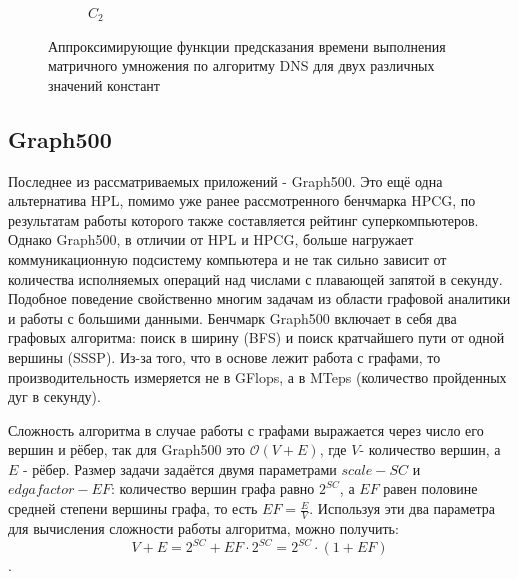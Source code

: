 \begin{figure}
\begin{subfigure}{.5\textwidth}
				\caption{\(C_2\)}
				\label{graph_C_2_DNS}
			\end{subfigure}
			\caption{Аппроксимирующие функции предсказания времени выполнения матричного умножения по алгоритму DNS для двух различных значений констант}
			\label{graph_DNS}
			\end{figure}

	\subsection{Graph500}
		Последнее из рассматриваемых приложений - Graph500. Это ещё одна альтернатива HPL, помимо уже ранее рассмотренного бенчмарка HPCG, по результатам работы которого также составляется рейтинг суперкомпьютеров. Однако Graph500, в отличии от HPL и HPCG, больше нагружает коммуникационную подсистему компьютера и не так сильно зависит от количества исполняемых операций над числами с плавающей запятой в секунду. Подобное поведение свойственно многим задачам из области графовой аналитики и работы с большими данными. Бенчмарк Graph500 включает в себя два графовых алгоритма: поиск в ширину (BFS) и поиск кратчайшего пути от одной вершины (SSSP). Из-за того, что в основе лежит работа с графами, то производительность измеряется не в GFlops, а в MTeps (количество пройденных дуг в секунду).

		Сложность алгоритма в случае работы с графами выражается через число его вершин и рёбер, так для Graph500 это \(\mathcal{O}(V + E)\), где \(V\)- количество вершин, а \(E\) - рёбер. Размер задачи задаётся двумя параметрами \(scale - SC\) и \(edgafactor - EF\): количество вершин графа равно \(2^{SC}\), а \(EF\) равен половине средней степени вершины графа, то есть \(EF = \frac{E}{V}\). Используя эти два параметра для вычисления сложности работы алгоритма, можно получить: \[V + E = 2^{SC} + EF \cdot 2^{SC} = 2^{SC} \cdot (1 + EF) \].


